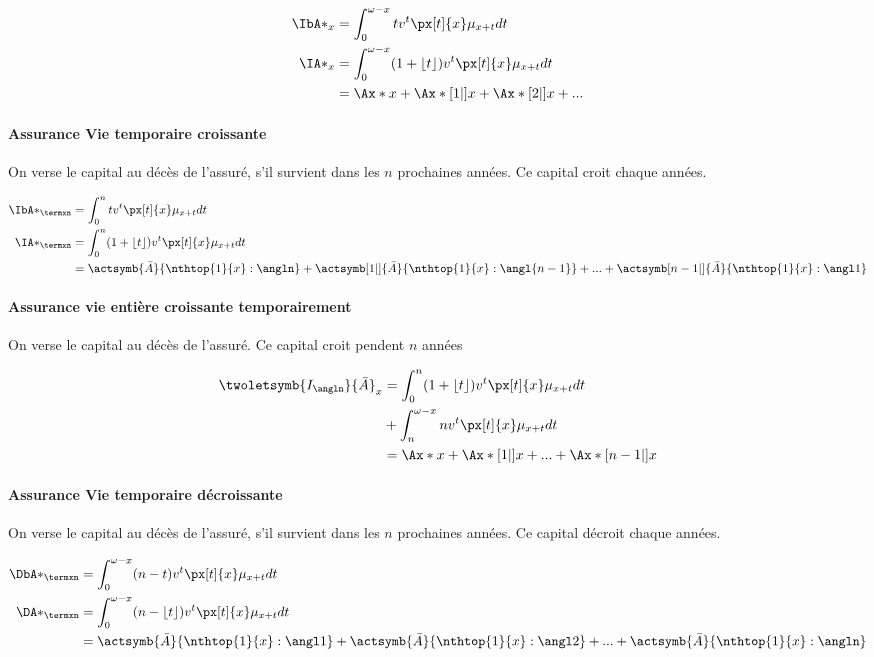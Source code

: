 \documentclass[10pt, french]{article}
\begin{document}
\begin{multicols*}{3}
\begin{align*}
	\IbA*_x &= \int_0^{\omega - x} t v^t \px[t]{x} \mu_{x+t} dt \\
	\IA*_{x} &= \int_0^{\omega - x} (1 + \lfloor t \rfloor) v^t \px[t]{x} \mu_{x+t} dt \\
		&= \Ax*{x} + \Ax*[1|]{x} + \Ax*[2|]{x} + ...
\end{align*}

\paragraph{Assurance Vie temporaire croissante} On verse le capital au décès de l'assuré, s'il survient dans les $n$ prochaines années. Ce capital croit chaque années.

\begin{align*}
	\IbA*_{\termxn} &= \int_0^n t v^t \px[t]{x} \mu_{x+t} dt \\
	\IA*_{\termxn}  &= \int_0^n (1 + \lfloor t \rfloor) v^t \px[t]{x} \mu_{x+t} dt \\
		&= \actsymb{\bar{A}}{\nthtop{1}{x}:\angln} + \actsymb[1|]{\bar{A}}{\nthtop{1}{x}:\angl{n-1}} + ... + \actsymb[n-1|]{\bar{A}}{\nthtop{1}{x}:\angl1}
\end{align*}

\paragraph{Assurance vie entière croissante temporairement} On verse le capital au décès de l'assuré. Ce capital croit pendent $n$ années

\begin{align*}
	\twoletsymb{I_{\angln}}{\bar{A}}_{x}  &= \int_0^n (1 + \lfloor t \rfloor) v^t \px[t]{x} \mu_{x+t} dt \\
	& + \int_n^{\omega - x} n v^t \px[t]{x} \mu_{x+t} dt \\
		&= \Ax*{x} + \Ax*[1|]{x} + ... + \Ax*[n-1|]{x}
\end{align*}

\paragraph{Assurance Vie temporaire décroissante} On verse le capital au décès de l'assuré, s'il survient dans les $n$ prochaines années. Ce capital décroit chaque années.

\begin{align*}
	\DbA*_{\termxn} &= \int_0^{\omega - x} (n - t) v^t \px[t]{x} \mu_{x+t} dt \\
	\DA*_{\termxn}  &= \int_0^{\omega - x} (n - \lfloor t \rfloor) v^t \px[t]{x} \mu_{x+t} dt \\
		&= \actsymb{\bar{A}}{\nthtop{1}{x}:\angl1} + \actsymb{\bar{A}}{\nthtop{1}{x}:\angl2} + ... + \actsymb{\bar{A}}{\nthtop{1}{x}:\angln}
\end{align*}


\end{multicols*}
\end{document}
